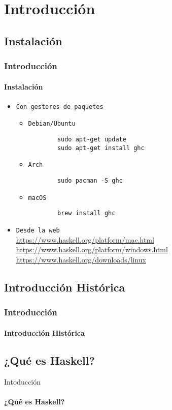 \section{Introducción}
\subsection{Instalación}
\begin{frame}[fragile]
  \frametitle{Introducción}
  \framesubtitle{Instalación}
  \begin{itemize}
  \item\texttt{Con gestores de paquetes}
    \begin{itemize}
    \item\texttt{Debian/Ubuntu}
      \begin{verbatim}
        sudo apt-get update
        sudo apt-get install ghc
      \end{verbatim}
    \item\texttt{Arch}
      \begin{verbatim}
        sudo pacman -S ghc
      \end{verbatim}
    \item\texttt{macOS}
      \begin{verbatim}
        brew install ghc
      \end{verbatim}
    \end{itemize}
  \item\texttt{Desde la web}\\
    \url{https://www.haskell.org/platform/mac.html}\\
    \url{https://www.haskell.org/platform/windows.html}\\
    \url{https://www.haskell.org/downloads/linux}
  \end{itemize}
\end{frame}

\subsection{Introducción Histórica}
\begin{frame}[fragile]          %
  \frametitle{Introducción}
  \framesubtitle{Introducción Histórica}

\end{frame}

\subsection{¿Qué es Haskell?}
\begin{frame}{Intoducción}      %
  \framesubtitle{¿Qué es Haskell?}

\end{frame}

